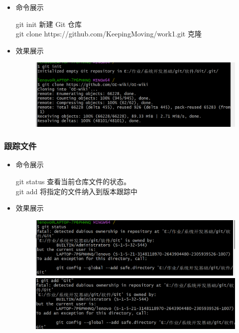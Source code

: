 \documentclass[UTF8]{ctexart}
\begin{document}
  \begin{itemize} 
  
      \item 命令展示

git init 新建 Git 仓库\\
git clone https://github.com/KeepingMoving/work1.git 克隆
   \item 效果展示

\begin{figure}[H]
\includegraphics[width=1\textwidth]{a}
\end{figure}

\end{itemize}


\subsubsection{跟踪文件}

\begin{itemize}
  \item 命令展示
 
     git status 查看当前仓库文件的状态。\\
     git add     将指定的文件纳入到版本跟踪中
\item 效果展示
\begin{figure}[H]
\includegraphics[width=1\textwidth]{2}
\includegraphics[width=1\textwidth]{3}
\end{figure}
\end{itemize}
\end{document}
